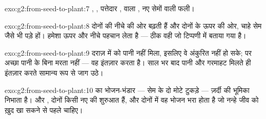 \begin{solution}{exo:g2:from-seed-to-plant:7}
, , पत्तेदार ,  वाला , नए सेमों वाली फली।
\end{solution}

\begin{solution}{exo:g2:from-seed-to-plant:8}
दोनों की  नीचे की ओर बढ़ती हैं और दोनों के  ऊपर की ओर, चाहे
सेम जैसे भी पड़े हों।  हमेशा ऊपर और नीचे पहचान लेता है --- ठीक
वही जो टिप्पणी में बताया गया है।
\end{solution}

\begin{solution}{exo:g2:from-seed-to-plant:9}
दराज़ में  को पानी नहीं मिला, इसलिए वे अंकुरित नहीं हो सके; पर
अच्छा  पानी के बिना मरता नहीं --- वह इंतज़ार करता है। साल भर बाद
पानी और गरमाहट मिलते ही इंतज़ार करते  सामान्य रूप से जाग उठे।
\end{solution}

\begin{solution}{exo:g2:from-seed-to-plant:10}
 का भोजन-भंडार --- सेम के दो मोटे टुकड़े --- ज़र्दी की भूमिका
निभाता है।  और , दोनों किसी नए  की शुरुआत हैं, और दोनों
में वह भोजन भरा होता है जो नन्हे जीव को ख़ुद खा सकने से पहले चाहिए।
\end{solution}
